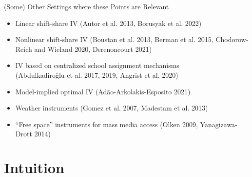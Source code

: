\documentclass{beamer}
\begin{document}
\begin{frame}{(Some) Other Settings where these Points are Relevant}
	\begin{itemize}
	\item Linear shift-share IV {\color{gray}(Autor et al. 2013, Borusyak et al. 2022)}
	\vspace{0.2cm}
	\item Nonlinear shift-share IV {\color{gray}(Boustan et al. 2013, Berman et al. \phantom{Z}2015, Chodorow-Reich and Wieland 2020, Derenoncourt 2021)} 
	\vspace{0.2cm}
	\item IV based on centralized school assignment mechanisms \\{\color{gray}\phantom{ZZZ}(Abdulkadiro\u{g}lu et al. 2017, 2019, Angrist et al. 2020)}
	\vspace{0.2cm}
	\item Model-implied optimal IV {\color{gray}(Ad\~{a}o-Arkolakis-Esposito 2021)}
	\vspace{0.2cm}
	\item Weather instruments {\color{gray}(Gomez et al. 2007, Madestam et al. 2013)}%
\vspace{0.2cm}
	\item ``Free space'' instruments for mass media access {\color{gray}(Olken 2009, \phantom{ZZZ}Yanagizawa-Drott 2014)}
	\end{itemize}	
\end{frame}

\section{Intuition}
\end{document}
